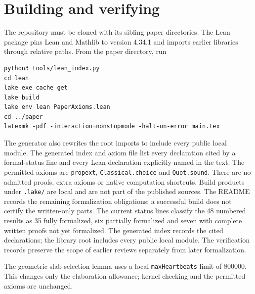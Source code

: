 \section{Building and verifying}\label{sec:verification}
The repository must be cloned with its sibling paper directories. The Lean
package pins Lean and Mathlib to version 4.34.1 and imports earlier libraries
through relative paths. From the paper directory, run
\begin{verbatim}
python3 tools/lean_index.py
cd lean
lake exe cache get
lake build
lake env lean PaperAxioms.lean
cd ../paper
latexmk -pdf -interaction=nonstopmode -halt-on-error main.tex
\end{verbatim}
The generator also rewrites the root imports to include every public local
module. The generated index and axiom file list every declaration cited by a
formal-status line and every Lean declaration explicitly named in the text.
The permitted axioms are \texttt{propext}, \texttt{Classical.choice} and
\texttt{Quot.sound}. There are no admitted proofs, extra axioms or native
computation shortcuts. Build products under \texttt{.lake/} are local and are
not part of the published sources. The README records the remaining formalization
obligations; a successful build does not certify the written-only parts.
The current status lines classify the 48 numbered results as 35 fully
formalized, six partially formalized and seven with complete written proofs
not yet formalized. The generated index records the cited declarations;
the library root includes every public local module. The verification records
preserve the scope of earlier reviews separately from later formalization.

The geometric slab-selection lemma uses a local \texttt{maxHeartbeats}
limit of 800000. This changes only the elaboration allowance; kernel checking
and the permitted axioms are unchanged.
